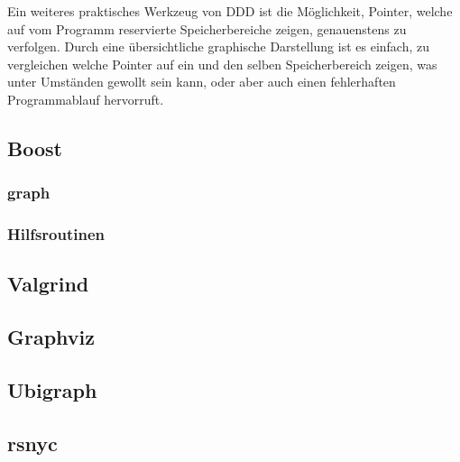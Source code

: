 Ein weiteres praktisches Werkzeug von DDD ist die Möglichkeit, Pointer, welche auf vom Programm reservierte Speicherbereiche zeigen, genauenstens zu verfolgen. Durch eine übersichtliche graphische Darstellung
ist es einfach, zu vergleichen welche Pointer auf ein und den selben Speicherbereich zeigen, was unter Umständen gewollt sein kann, oder aber auch einen fehlerhaften Programmablauf hervorruft.


\subsection{Boost}

\subsubsection{graph}

\subsubsection{Hilfsroutinen}

\subsection{Valgrind}

\subsection{Graphviz}

\subsection{Ubigraph}

\subsection{rsnyc}
